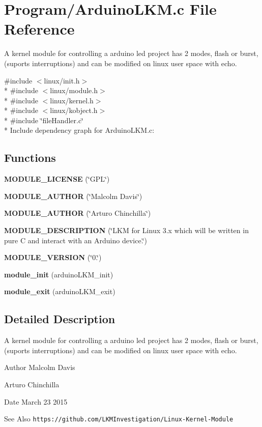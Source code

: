 \section{Program/\-Arduino\-L\-K\-M.c File Reference}
\label{_arduino_l_k_m_8c}


A kernel module for controlling a arduino led project has 2 modes, flash or burst, (suports interruptions) and can be modified on linux user space with echo.  


{\ttfamily \#include $<$linux/init.\-h$>$}\\*
{\ttfamily \#include $<$linux/module.\-h$>$}\\*
{\ttfamily \#include $<$linux/kernel.\-h$>$}\\*
{\ttfamily \#include $<$linux/kobject.\-h$>$}\\*
{\ttfamily \#include \char`\"{}file\-Handler.\-c\char`\"{}}\\*
Include dependency graph for Arduino\-L\-K\-M.\-c\-:
\subsection*{Functions}
\begin{DoxyCompactItemize}
\item 
{\bf M\-O\-D\-U\-L\-E\-\_\-\-L\-I\-C\-E\-N\-S\-E} (\char`\"{}G\-P\-L\char`\"{})
\item 
{\bf M\-O\-D\-U\-L\-E\-\_\-\-A\-U\-T\-H\-O\-R} (\char`\"{}Malcolm Davis\char`\"{})
\item 
{\bf M\-O\-D\-U\-L\-E\-\_\-\-A\-U\-T\-H\-O\-R} (\char`\"{}Arturo Chinchilla\char`\"{})
\item 
{\bf M\-O\-D\-U\-L\-E\-\_\-\-D\-E\-S\-C\-R\-I\-P\-T\-I\-O\-N} (\char`\"{}L\-K\-M for Linux 3.x which will be written in pure C and interact with an Arduino device.\char`\"{})
\item 
{\bf M\-O\-D\-U\-L\-E\-\_\-\-V\-E\-R\-S\-I\-O\-N} (\char`\"{}0.\char`\"{})
\item 
{\bf module\-\_\-init} (arduino\-L\-K\-M\-\_\-init)
\item 
{\bf module\-\_\-exit} (arduino\-L\-K\-M\-\_\-exit)
\end{DoxyCompactItemize}


\subsection{Detailed Description}
A kernel module for controlling a arduino led project has 2 modes, flash or burst, (suports interruptions) and can be modified on linux user space with echo. \begin{DoxyAuthor}{Author}
Malcolm Davis 

Arturo Chinchilla 
\end{DoxyAuthor}
\begin{DoxyDate}{Date}
March 23 2015 
\end{DoxyDate}
\begin{DoxySeeAlso}{See Also}
{\tt https\-://github.\-com/\-L\-K\-M\-Investigation/\-Linux-\/\-Kernel-\/\-Module} 
\end{DoxySeeAlso}


